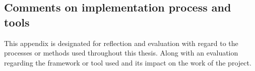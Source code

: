 \begin{appendices}



\chapter{Comments on implementation process and tools}

\label{ap:implementation_process}
This appendix is designated for reflection and evaluation with regard to the processes or methods used throughout this thesis. Along with an evaluation regarding the framework or tool used and its impact on the work of the project.









\end{appendices}